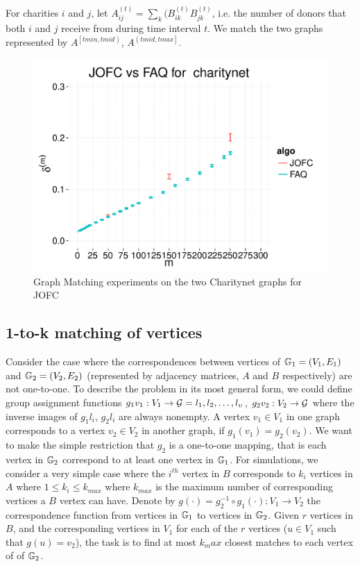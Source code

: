 \documentclass[12pt,oneside,final]{thesis}\usepackage[]{graphicx}\usepackage[]{color}
\begin{document}
For charities $i$ and $j$,
let $A_{ij}^{(t)}= \sum_{k}{(B_{ik}^{(t)}B_{jk}^{(t)}}$, i.e. the number of donors that both $i$ and $j$ receive from during time interval $t$.
We match the two graphs represented by  $A^{\left[ tmin,tmid \right)}$, $A^{\left(tmid,tmax\right]}$.

\begin{figure}
\includegraphics[scale=0.4]{charitynet_SGM_JOFCvsFAQ}
\caption{Graph Matching experiments on the two Charitynet graphs for JOFC \label{charitynet_graphmatch}}
\end{figure}

\subsection{1-to-k matching of vertices} 

Consider the case where the correspondences between vertices of $\mathbb{G}_1=(V_1,E_1)$ and $\mathbb{G}_2= (V_2,E_2)$ (represented by adjacency matrices, $A$ and $B$ respectively) are not one-to-one. To describe the problem in its most general form, we could define group assignment functions $g_1{v_1}: V_1 \rightarrow \mathcal{G}={l_1,l_2,\ldots,l_{\upsilon}}$, $g_2{v_2}:V_2 \rightarrow \mathcal{G}$ where the inverse images of $g_1{l_i}$, $g_2{l_i}$ are always nonempty. A vertex $v_1 \in  V_1$ in one graph corresponds to a vertex $v_2 \in  V_2$  in another graph, if $g_1(v_1)=g_2(v_2)$. We want to make the simple restriction that $g_2$ is a one-to-one mapping, that is each vertex in $\mathbb{G}_2$ correspond to at least one vertex in  $\mathbb{G}_1$.
For simulations, we consider a very simple case where the $i^{th}$ vertex in $B$ corresponds to $k_i$ vertices in $A$ where $1\leq k_i \leq k_{max}$ where $k_{max}$ is the maximum number of corresponding vertices a $B$ vertex can have.  Denote by $g(\cdot)=g_2^{-1}\circ g_1(\cdot) : V_1 \rightarrow V_2$ the correspondence function from vertices in $\mathbb{G}_1$ to vertices in $\mathbb{G}_2$. Given $r$ vertices in $B$, and the corresponding vertices in $V_1$ for each of the $r$ vertices ($u \in V_1$ such that $g(u)=v_2$), the task is  to find at most $k_max$ closest matches to each vertex of of $\mathbb{G}_2$. 
\end{document}
